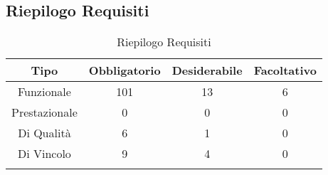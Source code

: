\subsection{Riepilogo Requisiti}
\normalsize
\begingroup
\renewcommand\arraystretch{2}
\begin{longtable}{|c|c|c|c|}
\hline 
\textbf{Tipo} & \textbf{Obbligatorio} & \textbf{Desiderabile} & \textbf{Facoltativo}\\
\hline
Funzionale & 101 & 13 & 6\\ \hline
Prestazionale & 0 & 0 & 0\\ \hline
Di Qualità & 6 & 1 & 0\\ \hline
Di Vincolo & 9 & 4  & 0\\ \hline
\caption[Riepilogo Requisiti]{Riepilogo Requisiti}
\label{tabella:riepilogorequi}
\end{longtable}
\endgroup
\clearpage

